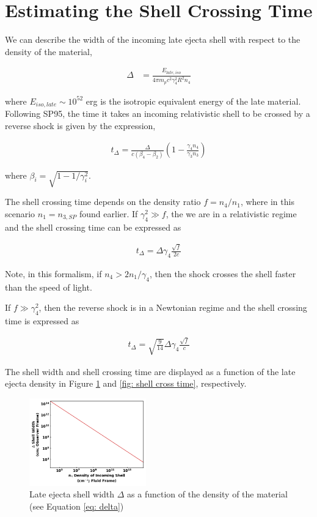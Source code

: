 \documentclass[linenumbers,twocolumn]{aastex631}
\begin{document}
\section{Estimating the Shell Crossing Time}
{
    We can describe the width of the incoming late ejecta shell with respect to the density of the material, 

    \begin{align}
        \Delta &= \frac{E_{late,iso}}{4 \pi m_p c^2 \gamma_4^2 R^2 n_4} \label{eq: delta}
    \end{align}

    where $E_{iso,late}\sim10^{52}$ erg is the isotropic equivalent energy of the late material. Following SP95, the time it takes an incoming relativistic shell to be crossed by a reverse shock is given by the expression, 

    \begin{align}
        t_{\Delta} = \frac{\Delta}{c(\beta_4 - \beta_2)} \left(1-\frac{\gamma_4 n_4}{\gamma_3 n_3}\right)
    \end{align} 

    where $\beta_i = \sqrt{1 - 1/\gamma_i^2}$.

    The shell crossing time depends on the density ratio $f = n_4/n_1$, where in this scenario $n_1 = n_{3,SP}$ found earlier. If $\gamma_4^2 \gg f$, the we are in a relativistic regime and the shell crossing time can be expressed as 

    \begin{align}
        t_{\Delta} = \Delta \gamma_4 \frac{\sqrt{f}}{2c}
    \end{align}

    Note, in this formalism, if $n_4> 2 n_1 / \gamma_4$, then the shock crosses the shell faster than the speed of light. 

    If $f\gg\gamma_4^2$, then the reverse shock is in a Newtonian regime and the shell crossing time is expressed as

    \begin{align}
        t_{\Delta} = \sqrt{\frac{9}{14}}\Delta\gamma_4\frac{\sqrt{f}}{c}
    \end{align}

    The shell width and shell crossing time are displayed as a function of the late ejecta density in Figure \ref{fig: shell width} and \ref{fig: shell cross time}, respectively. 

    \begin{figure}[t!]
        \centering
        \includegraphics[width=0.45\textwidth]{shell-width.png}
        \caption{Late ejecta shell width $\Delta$ as a function of the density of the material (see Equation \ref{eq: delta}) }
        \label{fig: shell width}
    \end{figure}

}
\end{document}
